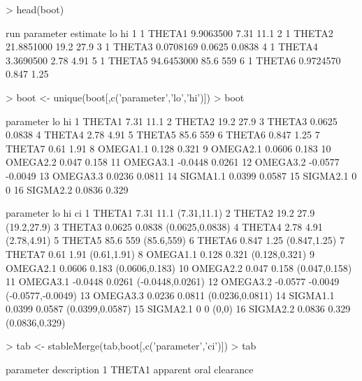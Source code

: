 \begin{Schunk}
\begin{Sinput}
> head(boot)
\end{Sinput}
\begin{Soutput}
  run parameter   estimate     lo     hi
1   1    THETA1  9.9063500   7.31   11.1
2   1    THETA2 21.8851000   19.2   27.9
3   1    THETA3  0.0708169 0.0625 0.0838
4   1    THETA4  3.3690500   2.78   4.91
5   1    THETA5 94.6453000   85.6    559
6   1    THETA6  0.9724570  0.847   1.25
\end{Soutput}
\begin{Sinput}
> boot <- unique(boot[,c('parameter','lo','hi')])
> boot
\end{Sinput}
\begin{Soutput}
   parameter      lo      hi
1     THETA1    7.31    11.1
2     THETA2    19.2    27.9
3     THETA3  0.0625  0.0838
4     THETA4    2.78    4.91
5     THETA5    85.6     559
6     THETA6   0.847    1.25
7     THETA7    0.61    1.91
8   OMEGA1.1   0.128   0.321
9   OMEGA2.1  0.0606   0.183
10  OMEGA2.2   0.047   0.158
11  OMEGA3.1 -0.0448  0.0261
12  OMEGA3.2 -0.0577 -0.0049
13  OMEGA3.3  0.0236  0.0811
14  SIGMA1.1  0.0399  0.0587
15  SIGMA2.1       0       0
16  SIGMA2.2  0.0836   0.329
\end{Soutput}
\begin{Soutput}
   parameter      lo      hi                ci
1     THETA1    7.31    11.1       (7.31,11.1)
2     THETA2    19.2    27.9       (19.2,27.9)
3     THETA3  0.0625  0.0838   (0.0625,0.0838)
4     THETA4    2.78    4.91       (2.78,4.91)
5     THETA5    85.6     559        (85.6,559)
6     THETA6   0.847    1.25      (0.847,1.25)
7     THETA7    0.61    1.91       (0.61,1.91)
8   OMEGA1.1   0.128   0.321     (0.128,0.321)
9   OMEGA2.1  0.0606   0.183    (0.0606,0.183)
10  OMEGA2.2   0.047   0.158     (0.047,0.158)
11  OMEGA3.1 -0.0448  0.0261  (-0.0448,0.0261)
12  OMEGA3.2 -0.0577 -0.0049 (-0.0577,-0.0049)
13  OMEGA3.3  0.0236  0.0811   (0.0236,0.0811)
14  SIGMA1.1  0.0399  0.0587   (0.0399,0.0587)
15  SIGMA2.1       0       0             (0,0)
16  SIGMA2.2  0.0836   0.329    (0.0836,0.329)
\end{Soutput}
\begin{Sinput}
> tab <- stableMerge(tab,boot[,c('parameter','ci')])
> tab
\end{Sinput}
\begin{Soutput}
   parameter                                   description
1     THETA1                       apparent oral clearance

\end{Soutput}
\end{Schunk}
